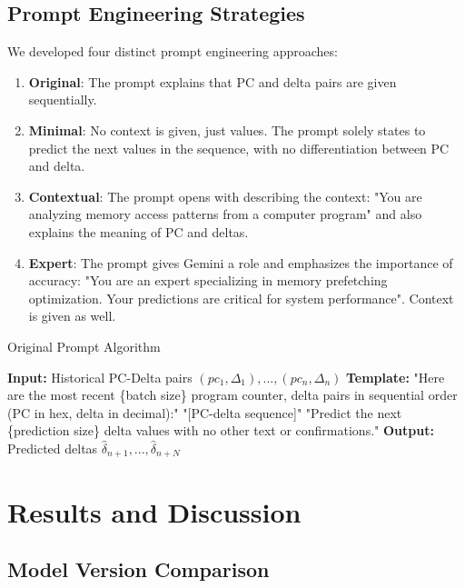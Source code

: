 \documentclass[sigconf,authorversion,nonacm]{acmart}
\begin{document}
\subsection{Prompt Engineering Strategies}

We developed four distinct prompt engineering approaches:
\begin{enumerate}
    \item \textbf{Original}: The prompt explains that PC and delta pairs are given sequentially.
    \item \textbf{Minimal}: No context is given, just values. The prompt solely states to predict the next values in the sequence, with no differentiation between PC and delta.
    \item \textbf{Contextual}: The prompt opens with describing the context: "You are analyzing memory access patterns from a computer program" and also explains the meaning of PC and deltas. 
    \item \textbf{Expert}: The prompt gives Gemini a role and emphasizes the importance of accuracy: "You are an expert specializing in memory prefetching optimization. Your predictions are critical for system performance". Context is given as well.
\end{enumerate}



\begin{algorithm}[H]
\caption{Original Prompt Algorithm}
\label{alg:direct-prompt}
\begin{algorithmic}[1]
\State \textbf{Input:} Historical PC-Delta pairs $(pc_1, \Delta_1), ..., (pc_n, \Delta_n)$
\State \textbf{Template:} 
\State "Here are the most recent \{batch size\} program counter, delta pairs in sequential order (PC in hex, delta in decimal):"
\State "[PC-delta sequence]"
\State "Predict the next \{prediction size\} delta values with no other text or confirmations."
\State \textbf{Output:} Predicted deltas $\hat{\delta}_{n+1}, ..., \hat{\delta}_{n+N}$
\end{algorithmic}
\end{algorithm}

\section{Results and Discussion}
\label{sec:results-discussion}

\subsection{Model Version Comparison}
\end{document}

